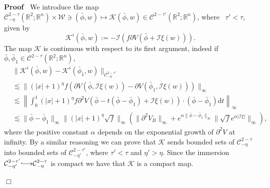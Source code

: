 \documentclass[a4paper,10pt]{article}
\newcommand{\assign}{:=}
\newcommand{\longhookrightarrow}{{\lhook\joinrel\relbar\joinrel\rightarrow}}
\newcommand{\mathd}{\mathrm{d}}
\newenvironment{proof}{\noindent\textbf{Proof\ }}{\hspace*{\fill}$\Box$\medskip}
\begin{document}
\begin{proof}
  We introduce the map $\mathcal{C}^{2 - \tau}_{- \eta} (\mathbb{R}^2 ;
  \mathbb{R}^n) \times \mathcal{W} \ni (\bar{\phi}, w) \mapsto \mathcal{K}
  (\bar{\phi}, w) \in \mathcal{C}^{2 - \tau'} (\mathbb{R}^2 ; \mathbb{R}^n)$,
  where \ $\tau' < \tau$, given by
  \[ \mathcal{K}^i (\bar{\phi}, w) \assign -\mathcal{I} (f \partial V
     (\bar{\phi} +\mathcal{I} \xi (w))) . \]
  The map $\mathcal{K}$ is continuous with respect to its first argument,
  indeed if $\bar{\phi}, \bar{\phi}_1 \in \mathcal{C}^{2 - \tau} (\mathbb{R}^2
  ; \mathbb{R}^n)$,
  \begin{eqnarray*}
    & \| \mathcal{K}^i (\bar{\phi}, w) - \mathcal{K}^i (\bar{\phi}_1, w)
    \|_{\mathcal{C}^{2 - \tau'}_{- \eta}} & \\
    & \lesssim \| (| x | + 1)^{\eta} f (\partial V (\bar{\phi}, \mathcal{I}
    \xi (w)) - \partial V (\bar{\phi}_1, \mathcal{I} \xi (w))) \|_{\infty} &
    \\
    & \lesssim \left\| \int_0^1 (| x | + 1)^{\eta} f \partial^2 V (\bar{\phi}
    - t (\bar{\phi} - \bar{\phi}_1) +\mathcal{I} \xi (w)) \cdot (\bar{\phi} -
    \bar{\phi}_1) \mathd t \right\|_{\infty} & \\
    & \lesssim \| \bar{\phi} - \bar{\phi}_1 \|_{\infty} \| (| x | + 1)^{\eta}
    \sqrt{f} \|_{\infty} \left( \| \partial^2 V_B \|_{\infty} + e^{\alpha \|
    \bar{\phi} - \bar{\phi}_1 \|_{\infty}} \| \sqrt{f} e^{\alpha | \mathcal{I}
    \xi |} \|_{\infty} \right), & 
  \end{eqnarray*}
  where the positive constant $\alpha$ depends on the exponential growth of
  $\partial^2 V$ at infinity. By a similar reasoning we can prove that
  $\mathcal{K}$ sends bounded sets of $\mathcal{C}^{2 - \tau}_{- \eta}$ into
  bounded sets of $\mathcal{C}^{2 - \tau'}_{- \eta'}$, where $\tau' < \tau$
  and $\eta' > \eta$. Since the immersion $\mathcal{C}^{2 - \tau'}_{- \eta'}
  \longhookrightarrow \mathcal{C}^{2 - \tau}_{- \eta}$ is compact we have that
  $\mathcal{K}$ is a compact map.
  

\end{proof}
\end{document}
